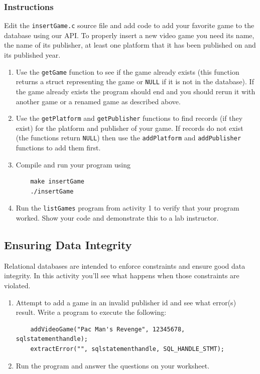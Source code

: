 \documentclass[12pt]{scrartcl}
\begin{document}
\subsubsection*{Instructions}

Edit the \texttt{insertGame.c} source file and add code to add 
your favorite game to the database using our API.  To properly insert 
a new video game you need its name, the name of its publisher, at 
least one platform that it has been published on and its published year.

\begin{enumerate}
  \item Use the \texttt{getGame} function to see if the game 
	already exists (this function returns a struct representing the game 
	or \texttt{NULL} if it is not in the database).  If the game 
	already exists the program should end and you should rerun it with 
	another game or a renamed game as described above.
  \item Use the \texttt{getPlatform} and \texttt{getPublisher} 
	functions to find records (if they exist) for the platform and publisher 
	of your game.  If records do not exist (the functions return 
	\texttt{NULL}) then use the \texttt{addPlatform} and 
	\texttt{addPublisher} functions to add them first.
  \item Compile and run your program using
	
	\begin{verbatim}
	make insertGame
	./insertGame
	\end{verbatim}
  \item Run the \texttt{listGames} program from activity 1 
  	to verify that your program worked.  Show your code and demonstrate 
	this to a lab instructor.
\end{enumerate}

\subsection{Ensuring Data Integrity}

Relational databases are intended to enforce constraints and ensure 
good data integrity.  In this activity you'll see what happens when those
constraints are violated.

\begin{enumerate}
  \item Attempt to add a game in an invalid publisher id and see what 
  	error(s) result.  Write a program to execute the following:
	
	\begin{verbatim}
	addVideoGame("Pac Man's Revenge", 12345678, sqlstatementhandle);
	extractError("", sqlstatementhandle, SQL_HANDLE_STMT);
	\end{verbatim}
  \item Run the program and answer the questions on your worksheet.
\end{enumerate}
\end{document}
